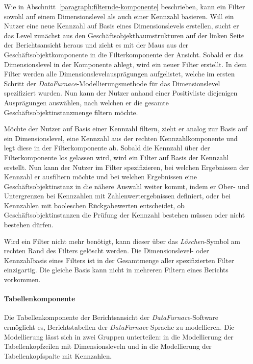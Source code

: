 \documentclass[
  language=german, %
  type=bachelor,%
  ngerman
]{isthesis}
\begin{document}
\begin{content}
  Wie in Abschnitt~\ref{paragraph:filternde-komponente}
  beschrieben, kann ein Filter sowohl auf einem Dimensionslevel als auch einer
  Kennzahl basieren. Will ein Nutzer eine neue Kennzahl auf Basis eines
  Dimensionslevels erstellen, sucht er das Level zunächst aus den
  Geschäftsobjektbaumstrukturen auf der linken Seite der Berichtsansicht heraus
  und zieht es mit der Maus aus der Geschäftsobjektkomponente in die
  Filterkomponente der Ansicht. Sobald er das Dimensionslevel in der Komponente
  ablegt, wird ein neuer Filter erstellt. In dem Filter werden alle
  Dimensionslevelausprägungen aufgelistet, welche im ersten Schritt der
  \textit{DataFurnace}-Modellierungsmethode für das Dimensionslevel
  spezifiziert wurden. Nun kann der Nutzer anhand einer Positivliste
  diejenigen Ausprägungen auswählen, nach welchen er die gesamte
  Geschäftsobjektinstanzmenge filtern möchte.

  Möchte der Nutzer auf Basis einer Kennzahl filtern, zieht er analog zur
  Basis auf ein Dimensionslevel, eine Kennzahl aus der rechten
  Kennzahlkomponente und legt diese in der Filterkomponente ab. Sobald die
  Kennzahl über der Filterkomponente los gelassen wird, wird ein Filter auf
  Basis der Kennzahl erstellt. Nun kann der Nutzer im Filter spezifizieren, bei
  welchen Ergebnissen der Kennzahl er ausfiltern möchte und bei welchen
  Ergebnissen eine Geschäftsobjektinstanz in die nähere Auswahl weiter kommt,
  indem er \zB{} Ober- und Untergrenzen bei Kennzahlen mit
  Zahlenwertergebnissen definiert, oder bei Kennzahlen mit booleschen
  Rückgabewerten entscheidet, ob Geschäftsobjektinstanzen die Prüfung der
  Kennzahl bestehen müssen oder nicht bestehen dürfen.

  Wird ein Filter nicht mehr benötigt, kann dieser über das
  \textit{Löschen}-Symbol am rechten Rand des Filters gelöscht werden. Die
  Dimensionslevel- oder Kennzahlbasis eines Filters ist in der Gesamtmenge
  aller spezifizierten Filter einzigartig. Die gleiche Basis kann nicht in
  mehreren Filtern eines Berichts vorkommen.

  \paragraph{Tabellenkomponente}

  Die Tabellenkomponente der Berichtsansicht der \textit{DataFurnace}-Software
  ermöglicht es, Berichtstabellen der \textit{DataFurnace}-Sprache zu
  modellieren. Die Modellierung lässt sich in zwei Gruppen unterteilen: in die
  Modellierung der Tabellenkopfzeilen mit Dimensionsleveln und in die
  Modellierung der Tabellenkopfspalte mit Kennzahlen.


\end{content}
\end{document}
